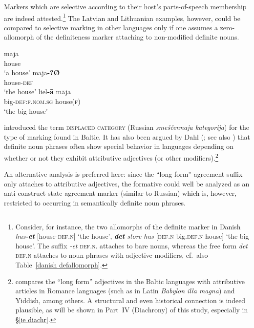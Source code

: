 Markers which are selective according to their host's parts-of-speech membership are indeed attested.\footnote{Consider, for instance, the two allomorphs of the definite marker in Danish \textit{hus\textbf{-et}} [house-\textsc{def.n}] ‘the house’, \textit{\textbf{det} store hus} [\textsc{def.n} big\textsc{.def.n} house] ‘the big house’. The suffix \textit{-et} \textsc{def.n.} attaches to bare nouns, whereas the free form \textit{det} \textsc{def.n} attaches to noun phrases with adjective modifiers, cf.~also Table~\ref{danish defallomorph}.} The Latvian and Lithuanian examples, however, could be compared to selective marking in other languages only if one assumes a zero-allomorph of the definiteness marker attaching to non-modified definite nouns.
\begin{exe}
\ex
{}
\begin{xlist}
\ex
\gll 	māja\\
	house\\
\glt	‘a house’
\ex	
\gll 	māja\textbf{-?Ø}\\
	house-\textsc{def}\\
\glt	‘the house’
\ex		
\gll 	liel\textbf{-ā} māja\\
	big-\textsc{def:f.nom.sg} house(\textsc{f})\\
\glt	‘the big house’
\end{xlist}
\end{exe}
\citet[31]{melcuk1998} introduced the term \textsc{displaced category} (Russian \textit{smeščennaja kategorija}) for the type of marking found in Baltic. It has also been argued by Dahl (\citeyear[149–152]{dahl2003}; see also \citealt[122–123]{dahl2015a}) that definite noun phrases often show special behavior in languages depending on whether or not they exhibit attributive adjectives (or other modifiers).\footnote{\citet[150]{dahl2003} compares the “long form” adjectives in the Baltic languages with attributive articles in Romance languages (such as in Latin \textit{Babylon illa magna}) and Yiddish, among others. A structural and even historical connection is indeed plausible, as will be shown in Part~IV (Diachrony) of this study, especially in \S\ref{ie diachr}.}

An alternative analysis is preferred here: since the “long form” agreement suffix only attaches to attributive adjectives, the formative could well be analyzed as an anti\hyp{}construct state agreement marker (similar to Russian) which is, however, restricted to occurring in semantically definite noun phrases. 

